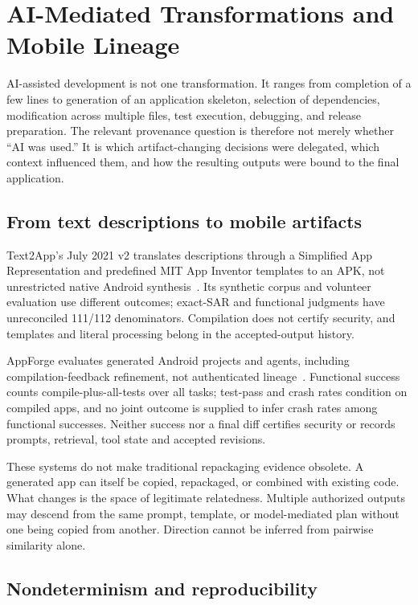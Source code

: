 \section{AI-Mediated Transformations and Mobile Lineage}
\label{sec:ai}

AI-assisted development is not one transformation. It ranges from completion of a few lines to generation of an application skeleton, selection of dependencies, modification across multiple files, test execution, debugging, and release preparation. The relevant provenance question is therefore not merely whether ``AI was used.'' It is which artifact-changing decisions were delegated, which context influenced them, and how the resulting outputs were bound to the final application.

\subsection{From text descriptions to mobile artifacts}

Text2App's July 2021 v2 translates descriptions through a Simplified App Representation and predefined MIT App Inventor templates to an APK, not unrestricted native Android synthesis~\cite{text2app}. Its synthetic corpus and volunteer evaluation use different outcomes; exact-SAR and functional judgments have unreconciled 111/112 denominators. Compilation does not certify security, and templates and literal processing belong in the accepted-output history.

AppForge evaluates generated Android projects and agents, including compilation-feedback refinement, not authenticated lineage~\cite{appforge}. Functional success counts compile-plus-all-tests over all tasks; test-pass and crash rates condition on compiled apps, and no joint outcome is supplied to infer crash rates among functional successes. Neither success nor a final diff certifies security or records prompts, retrieval, tool state and accepted revisions.

These systems do not make traditional repackaging evidence obsolete. A generated app can itself be copied, repackaged, or combined with existing code. What changes is the space of legitimate relatedness. Multiple authorized outputs may descend from the same prompt, template, or model-mediated plan without one being copied from another. Direction cannot be inferred from pairwise similarity alone.

\subsection{Nondeterminism and reproducibility}

